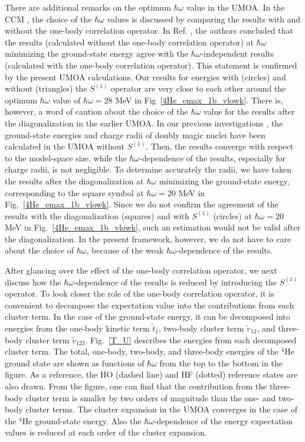 \documentclass[aps,prc, dvips, twocolumn,groupedaddress,showkeys,showpacs,floatfix,superscriptaddress]{revtex4-1}
\newcommand{\<}{\langle}
\renewcommand{\>}{\rangle}
\begin{document}
There are additional remarks on the optimum $\hbar\omega$ value in the UMOA.
In the CCM \cite{Kohno:2012}, the choice of the $\hbar\omega$ values is discussed by comparing the
 results with and without the one-body correlation operator.
 In Ref. \cite{Kohno:2012}, the authors concluded that the results (calculated without the one-body correlation operator)
  at $\hbar\omega$ minimizing the ground-state energy agree with the $\hbar\omega$-independent
  results (calculated with the one-body correlation operator).
This statement is confirmed by the present UMOA calculations.
Our results for energies with (circles) and without (triangles) the $S^{(1)}$ operator
 are very close to each other around the optimum $\hbar\omega$ value of $\hbar\omega = 28$ MeV in Fig~\ref{4He_emax_1b_vlowk}.
There is, however, a word of caution about the choice of the $\hbar\omega$ value for the results after the diagonalization
in the earlier UMOA.
In our previous investigations \cite{Miyagi:2014,Miyagi:2015}, the ground-state energies and
 charge radii of doubly magic nuclei have been calculated in the UMOA without $S^{(1)}$.
Then, the results converge with respect to the model-space size, while
 the $\hbar\omega$-dependence of the results, especially for charge radii, is not negligible.
To determine accurately the radii, we have taken the results after the diagonalization at
 $\hbar\omega$ minimizing the ground-state energy,
corresponding to the square symbol at $\hbar\omega=20$ MeV in Fig.~\ref{4He_emax_1b_vlowk}.
Since we do not confirm the agreement of the results with the diagonalization (squares) and
 with $S^{(1)}$ (circles) at $\hbar\omega=20$ MeV in Fig.~\ref{4He_emax_1b_vlowk},
 such an estimation would not be valid after the diagonalization.
In the present framework, however, we do not have to care about the choice of
 $\hbar\omega$, because of the weak $\hbar\omega$-dependence of the results.

After glancing over the effect of the one-body correlation operator,
we next discuss how the $\hbar\omega$-dependence of the results is reduced
 by introducing the $S^{(1)}$ operator.
To look closer the role of the one-body correlation operator, it is convenient to
 decompose the expectation value into the contributions from each cluster term.
In the case of the ground-state energy, it can be decomposed into energies from
the one-body kinetic term $\widetilde{t}_{1}$, two-body cluster term
 $\widetilde{v}_{12}$, and three-body cluster term $\widetilde{v}_{123}$.
Fig.~\ref{T_U} describes the energies from each decomposed cluster term.
The total, one-body, two-body, and three-body energies
of the $^{4}$He ground state are shown as functions of $\hbar\omega$ from the top to the bottom in the figure.
As a reference, the HO (dashed line) and HF (dotted) reference states are also drawn.
From the figure, one can find that the contribution from the three-body cluster term
is smaller by two orders of magnitude than the one- and two-body cluster terms.
The cluster expansion in the UMOA converges in the case of the $^4$He ground-state energy.
Also the $\hbar\omega$-dependence of the energy expectation values is reduced at each order of the cluster expansion.
\end{document}
